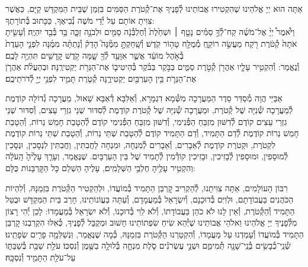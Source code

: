 \documentclass[twoside, openany, parskip=half, 11pt]{book}
\begin{document}
\newcommand{\ketoret}{
אַתָּה הוּא יְיָ אֱלֹהֵינוּ שֶׁהִקְטִירוּ אֲבוֹתֵינוּ לְ֯פָנֶיךָ אֶת־קְ֯טֹרֶת הַסַּמִּים בִּזְמַן שֶׁבֵּית הַמִּקְדָּשׁ קַיָּם, כַּאֲשֶׁר צִוִּיתָ אוֹתָם עַל יְ֯דֵי מֹשֶׁה נְ֯בִיאֶךָ, כַּכָּתוּב בְּ֯תוֹרָתֶךָ:\\
וַיֹּ֩אמֶר֩ יְיָ֨ אֶל־מֹשֶׁ֜ה קַח־לְ֯ךָ֣ סַמִּ֗ים\source{שמות ל} נָטָ֤ף ׀ וּשְׁחֵ֙לֶת֙ וְ֯חֶלְבְּ֯נָ֔ה סַמִּ֖ים וּלְבֹנָ֣ה זַכָּ֑ה בַּ֥ד בְּ֯בַ֖ד יִהְיֶֽה׃ וְ֯עָשִׂ֤יתָ אֹתָהּ֙ קְ֯טֹ֔רֶת רֹ֖קַח מַעֲשֵׂ֣ה רוֹקֵ֑חַ מְ֯מֻלָּ֖ח טָה֥וֹר קֹֽדֶשׁ׃ וְ֯שָֽׁחַקְתָּ֣ מִמֶּ֘נָּה֮ הָדֵק֒ וְ֯נָתַתָּ֨ה מִמֶּ֜נָּה לִפְנֵ֤י הָעֵדֻת֙ בְּ֯אֹ֣הֶל מוֹעֵ֔ד אֲשֶׁ֛ר אִוָּעֵ֥ד לְ֯ךָ֖ שָׁ֑מָּה קֹ֥דֶשׁ קׇֽדָשִׁ֖ים תִּהְיֶ֥ה לָכֶֽם׃\\
וְ֯נֶאֱמַר: וְ֯הִקְטִ֥יר עָלָ֛יו אַהֲרֹ֖ן קְ֯טֹ֣רֶת סַמִּ֑ים בַּבֹּ֣קֶר בַּבֹּ֗קֶר בְּ֯הֵיטִיב֛וֹ אֶת־הַנֵּרֹ֖ת יַקְטִירֶֽנָּה׃ וּבְהַעֲלֹ֨ת אַהֲרֹ֧ן אֶת־הַנֵּרֹ֛ת בֵּ֥ין הָעַרְבַּ֖יִם יַקְטִירֶ֑נָּה קְ֯טֹ֧רֶת תָּמִ֛יד לִפְנֵ֥י יְיָ֖ לְ֯דֹרֹתֵיכֶֽם׃


}
\\
\tamid
\\
\ketoret
אַבַּיֵּי הֲוָה מְ֯סַדֵּר סֵדֶר הַמַּעֲרָכָה  מִשְּׁ֯מָא דִגְמָרָא, וְ֯אַלִּבָּא דְ֯אַבָּא שָׁאוּל, מַעֲרָכָה גְ֯דוֹלָה קוֹדֶמֶת לְ֯מַעֲרָכָה שְׁ֯נִיָּה שֶׁל קְ֯טֹרֶת, וּמַעֲרָכָה שְׁ֯נִיָּה שֶׁל קְ֯טֹרֶת קוֹדֶמֶת לְ֯סִדּוּר שְׁנֵי גִזְרֵי עֵצִים, וְ֯סִדּוּר שְׁנֵי גִזְרֵי עֵצִים קוֹדֶם לְ֯דִשּׁוּן מִזְבֵּחַ הַפְּ֯נִימִי, וְ֯דִשּׁוּן מִזְבֵּחַ הַפְּ֯נִימִי קוֹדֶם לְ֯הַטָבַת חָמֵשׁ נֵרוֹת, וְ֯הַטָבַת חָמֵשׁ נֵרוֹת קוֹדֶמֶת לְ֯דַם הַתָּמִיד, וְ֯דַם הַתָּמִיד קוֹדֶם לְ֯הַטָבַת שְׁתֵּי נֵרוֹת, וְ֯הַטָבַת שְׁתֵּי נֵרוֹת קוֹדֶמֶת לִקְטֹרֶת, וּקְטֹרֶת קוֹדֶמֶת לְ֯אֵבָרִים, וְ֯אֵבָרִים לְ֯מִנְחָה, וּמִנְחָה לַחֲבִתִּין, וַחֲבִתִּין לִנְסָכִין, וּנְסָכִין לְ֯מוּסָפִין, וּמוּסָפִין לְ֯בָזִיכִין, וּבָזִיכִין קוֹדְ֯מִין לְ֯תָמִיד שֶׁל בֵּין הָעַרְבָּיִם. שֶׁנֶּאֱמַר, וְעָרַ֤ךְ  עָלֶ֙יהָ֙ הָֽעֹלָ֔ה וְהִקְטִ֥יר עָלֶ֖יהָ חֶלְבֵ֥י הַשְּׁלָמִֽים׃, עָלֶיהָ הַשְׁלֵם כָּל הַקׇּרְבָּנוֹת כֻּלָּם:

רִבּוֹן הָעוֹלָמִים, אַתָּה צִוִּיתָנוּ, לְ֯הַקְרִיב קׇרְבַּן הַתָּמִיד בְּ֯מוֹעֲדוֹ, וּלְהַקְטִיר הַקְּ֯טֹרֶת בִּזְמַנָּהּ, וְ֯לִהְיוֹת הַכֹּהֲנִים בַּעֲבוֹדָתָם, וּלְוִיִּם בְּ֯דוּכָנָם, וְ֯יִשְׂרָאֵל בְּ֯מַעֲמָדָם, וְ֯עַתָּה בַּעֲוֹנוֹתֵינוּ, חָרַב בֵּית הַמִּקְדָּשׁ וּבֻטַּל הַתָּמִיד וְ֯הַקְּ֯טֹרֶת, וְ֯אֵין לָנוּ לֹא כֹהֵן בַּעֲבוֹדָתוֹ, וְ֯לֹא לֵוִי בְּ֯דוּכָנוֹ, וְ֯לֹא יִשְׂרָאֵל בְּ֯מַעֲמָדוֹ: לָכֵן יְ֯הִי רָצוֹן מִלְּ֯פָנֶיךָ יְיָ אֱלֹהֵינוּ וֵאלֹהֵי אֲבוֹתֵינוּ שֶׁיְּ֯הֵא שִׂיחַ שִׂפְתוֹתֵינוּ חָשׁוּב וּמְקֻבָּל לְ֯פָנֶיךָ, כְּ֯אִלּוּ הִקְרַבְנוּ קׇרְבַּן הַתָּמִיד בְּ֯מוֹעֲדוֹ וְ֯עָמַדְנוּ עַל מַעֲמָדוֹ, וְ֯הִקְטַרְנוּ הַקְּ֯טֹרֶת בִּזְמַנָּהּ, כְּ֯מָה שֶׁנֶּאֱמַר, וּֽנְשַׁלְּמָ֥ה  פָרִ֖ים שְׂפָתֵֽינוּ׃\\
\shabbos
{}
שְׁ֯נֵֽי־כְ֯בָשִׂ֥ים בְּ֯נֵֽי־שָׁנָ֖ה תְּ֯מִימִ֑ם וּשְׁנֵ֣י עֶשְׂרֹנִ֗ים סֹ֧לֶת מִנְחָ֛ה בְּ֯לוּלָ֥ה בַשֶּׁ֖מֶן וְ֯נִסְכּֽוֹ׃
עֹלַ֥ת שַׁבַּ֖ת בְּ֯שַׁבַּתּ֑וֹ עַל־עֹלַ֥ת הַתָּמִ֖יד וְ֯נִסְכָּֽהּ׃
\end{document}
